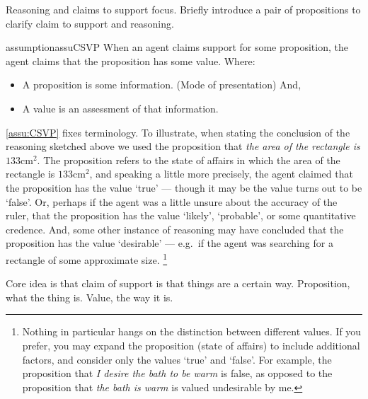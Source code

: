 \begin{note}
  Reasoning and claims to support focus.
  Briefly introduce a pair of propositions to clarify claim to support and reasoning.

  \begin{restatable}{assumption}{assuCSVP}
    \label{assu:CSVP}
    When an agent claims support for some proposition, the agent claims that the proposition has some value.
    Where:
    \begin{itemize}
    \item A proposition is some information. (Mode of presentation) And,
    \item A value is an assessment of that information.
    \end{itemize}
    \vspace{-\baselineskip}
  \end{restatable}
  \autoref{assu:CSVP} fixes terminology.
  To illustrate, when stating the conclusion of the reasoning sketched above we used the proposition that \emph{the area of the rectangle is \(133\text{cm}^{2}\)}.
  The proposition refers to the state of affairs in which the area of the rectangle is \(133\text{cm}^{2}\), and speaking a little more precisely, the agent claimed that the proposition has the value `true' --- though it may be the value turns out to be `false'.
  Or, perhaps if the agent was a little unsure about the accuracy of the ruler, that the proposition has the value `likely', `probable', or some quantitative credence.
  And, some other instance of reasoning may have concluded that the proposition has the value `desirable' --- e.g.\ if the agent was searching for a rectangle of some approximate size.\nolinebreak
  \footnote{
    Nothing in particular hangs on the distinction between different values.
    If you prefer, you may expand the proposition (state of affairs) to include additional factors, and consider only the values `true' and `false'.
    For example, the proposition that \emph{I desire the bath to be warm} is false, as opposed to the proposition that \emph{the bath is warm} is valued undesirable by me.
  }

  Core idea is that claim of support is that things are a certain way.
  Proposition, what the thing is.
  Value, the way it is.
\end{note}

